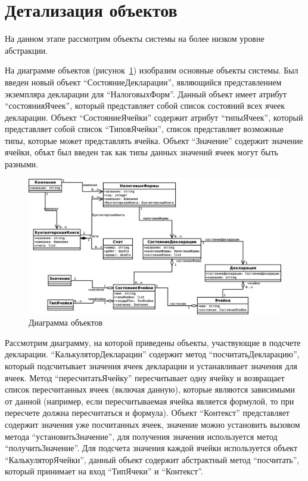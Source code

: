 \documentclass[14pt,a4paper]{reportmod}
\begin{document}
\section{Детализация объектов}
На данном этапе рассмотрим объекты системы на более низком уровне абстракции.

На диаграмме объектов (рисунок~\ref{pic:classes_1}) изобразим основные объекты системы. Был введен новый объект ``СостояниеДекларации'', являющийся представлением экземпляра декларации для ``НалоговыхФорм''. Данный объект имеет атрибут ``состоянияЯчеек'', который представляет собой список состояний всех ячеек декларации. Объект ``СостояниеЯчейки'' содержит атрибут ``типыЯчеек'', который представляет собой список ``ТиповЯчейки'', список представляет возможные типы, которые может представлять ячейка. Объект ``Значение'' содержит значение ячейки, объкт был введен так как типы данных значений ячеек могут быть разными.

\begin{figure}
  \centering
  \includegraphics[scale=0.4]{uml/_classes_1}
  \caption{Диаграмма объектов}
  \label{pic:classes_1}
\end{figure}

Рассмотрим диаграмму, на которой приведены объекты, участвующие в подсчете декларации. ``КалькуляторДекларации'' содержит метод ``посчитатьДекларацию'', который подсчитывает значения ячеек декларации и устанавливает значения для ячеек. Метод ``пересчитатьЯчейку'' пересчитывает одну ячейку и возвращает список пересчитанных ячеек (включая данную), которые являются зависимыми от данной (например, если пересчитываемая ячейка является формулой, то при пересчете должна пересчитаться и формула). Объект ``Контекст'' представляет содержит значения уже посчитанных ячеек, значение можно установить вызовом метода ``установитьЗначение'', для получения значения используется метод ``получитьЗначение''. Для подсчета значения каждой ячейки используется объект ``КалькуляторЯчейки'', данный объект содержит абстрактный метод ``посчитать'', который принимает на вход ``ТипЯчеки'' и ``Контекст''.
\end{document}
